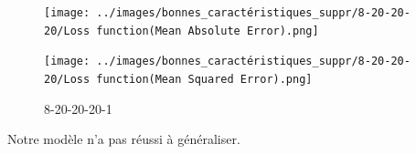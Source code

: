 \begin{figure}[!htb]
    \begin{minipage}{0.5\textwidth}
        \centering
        \texttt{[image: ../images/bonnes\_caractéristiques\_suppr/8-20-20-20/Loss function(Mean Absolute Error).png]}
        \label{fig:8-20-20-20-1.1}
    \end{minipage}\hfill
    \begin{minipage}{0.5\textwidth}
        \centering
        \texttt{[image: ../images/bonnes\_caractéristiques\_suppr/8-20-20-20/Loss function(Mean Squared Error).png]}
        \label{fig:8-20-20-20-1.1.2}
    \end{minipage}
    \caption{8-20-20-20-1}
\end{figure}

\vspace{1cm}

Notre modèle n'a pas réussi à généraliser.
\newpage
